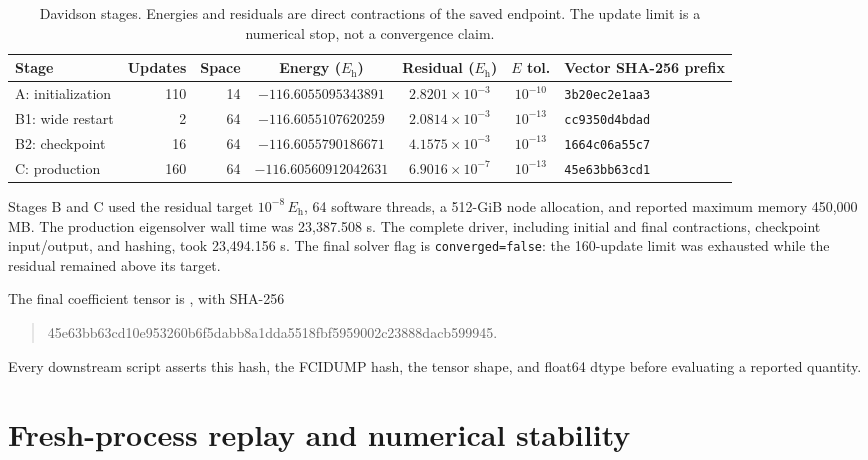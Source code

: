 \documentclass[aps,onecolumn,superscriptaddress,nofootinbib,longbibliography]{revtex4-2}
\newcommand{\Eh}{E_{\mathrm h}}
\begin{document}
\begin{table}[t]
\caption{Davidson stages.  Energies and residuals are direct contractions of
the saved endpoint.  The update limit is a numerical stop, not a convergence
claim.}
\label{tab:stages}
\small
\setlength{\tabcolsep}{3.2pt}
\begin{tabularx}{\textwidth}{@{}>{\raggedright\arraybackslash}Xrrcccl@{}}
\toprule
Stage & Updates & Space & Energy (\(\Eh\)) & Residual (\(\Eh\)) & \(E\) tol. & Vector SHA-256 prefix \\
\midrule
A: initialization & 110 & 14 & \(-116.6055095343891\) & \(2.8201\times10^{-3}\) & \(10^{-10}\) & \texttt{3b20ec2e1aa3} \\
B1: wide restart & 2 & 64 & \(-116.6055107620259\) & \(2.0814\times10^{-3}\) & \(10^{-13}\) & \texttt{cc9350d4bdad} \\
B2: checkpoint & 16 & 64 & \(-116.6055790186671\) & \(4.1575\times10^{-3}\) & \(10^{-13}\) & \texttt{1664c06a55c7} \\
C: production & 160 & 64 & \(-116.60560912042631\) & \(6.9016\times10^{-7}\) & \(10^{-13}\) & \texttt{45e63bb63cd1} \\
\bottomrule
\end{tabularx}
\end{table}

Stages B and C used the residual target \(10^{-8}\,\Eh\), 64 software
threads, a 512-GiB node allocation, and reported maximum memory 450,000 MB.
The production eigensolver wall time was 23,387.508 s.  The complete driver,
including initial and final contractions, checkpoint input/output, and hashing,
took 23,494.156 s.  The final solver flag is
\texttt{converged=false}: the 160-update limit was exhausted while the residual
remained above its target.

The final coefficient tensor is , with SHA-256
\begin{quote}\small\ttfamily
45e63bb63cd10e953260b6f5dabb8a1dda5518fbf5959002c23888dacb599945.
\end{quote}
Every downstream script asserts this hash, the FCIDUMP hash, the tensor shape,
and float64 dtype before evaluating a reported quantity.

\section{Fresh-process replay and numerical stability}
\end{document}
